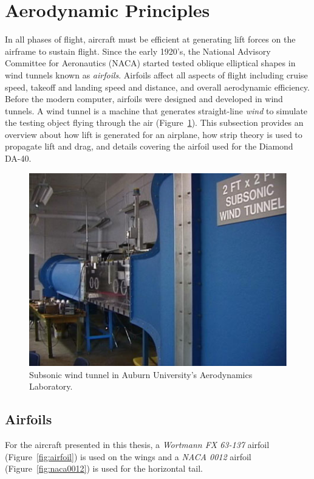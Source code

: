 \section{Aerodynamic Principles}\label{section:aerodynamic}
In all phases of flight, aircraft must be efficient at generating lift forces on the airframe to sustain flight. Since the early 1920's, the National Advisory Committee for Aeronautics (NACA) started tested oblique elliptical shapes in wind tunnels known as \textit{airfoils}. Airfoils affect all aspects of flight including cruise speed, takeoff and landing speed and distance, and overall aerodynamic efficiency. Before the modern computer, airfoils were designed and developed in wind tunnels. A wind tunnel is a machine that generates straight-line \textit{wind} to simulate the testing object flying through the air (Figure~\ref{fig:windtunnel}). This subsection provides an overview about how lift is generated for an airplane, how strip theory is used to propagate lift and drag, and details covering the airfoil used for the Diamond DA-40.

\begin{figure}[!ht]\label{fig:windtunnel}
    \centering
    \includegraphics[width=.75\linewidth]{Figures/opencircuitwindtunnel.jpg}
    \caption{Subsonic wind tunnel in Auburn University's Aerodynamics Laboratory.}
\end{figure}

\subsection{Airfoils}
For the aircraft presented in this thesis, a \textit{Wortmann FX 63{-}137} airfoil (Figure~\ref{fig:airfoil}) is used on the wings and a \textit{NACA 0012} airfoil (Figure~\ref{fig:naca0012}) is used for the horizontal tail.

